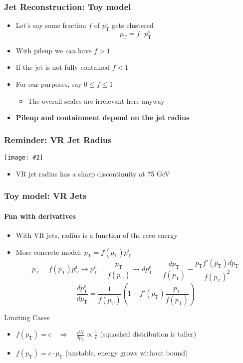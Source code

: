 \documentclass[xcolor={table}]{beamer}
\newcommand{\pt}{p_{\mathrm{T}}}
\newcommand{\ptr}{\pt}
\newcommand{\ptt}{\pt^{\text{s}}}
\newcommand{\graphic}[2][0.99]{\texttt{[image: \#2]}}
\begin{document}
\begin{frame}
  \frametitle{Jet Reconstruction: Toy model}
  \begin{itemize}
  \item Let's say some fraction $f$ of $\ptt$ gets clustered
    \[\ptr = f \cdot \ptt \]
  \item With pileup we \emph{can} have $f > 1$
  \item If the jet is not fully contained $f < 1$
  \item For our purposes, say $0 \leq f \leq 1$
    \begin{itemize}
    \item The overall scales are irrelevant here anyway
    \end{itemize}
  \item \textbf{Pileup and containment depend on the jet radius}
  \end{itemize}
\end{frame}

\begin{frame}
  \frametitle{Reminder: VR Jet Radius}
  \begin{center}
    \graphic[0.8]{radii-vs-pt.pdf}
  \begin{itemize}
  \item VR jet radius has a sharp discontinuity at 75 GeV
  \end{itemize}
  \end{center}
\end{frame}

\begin{frame}
  \frametitle{Toy model: VR Jets}
  \framesubtitle{Fun with derivatives}
  \begin{itemize}
  \item With VR jets, radius is a function of the reco energy
  \item More concrete model: $\boxed{\ptr = f(\ptr) \ptt}$
    \[ \ptr = f(\ptr) \ptt \to \ptt = \frac{\ptr}{f(\ptr)} \to d\ptt = \frac{d\ptr}{f(\ptr)} - \frac{\ptr f'(\ptr) d\ptr}{f(\ptr)^2} \]
    \[ \boxed{ \frac{d\ptt}{d\ptr} = \frac{1}{f(\ptr)} \left( 1 - f'(\ptr) \frac{\ptr}{f(\ptr)} \right) } \]
  \end{itemize}
  \begin{block}{Limiting Cases}
    \begin{itemize}
    \item $f(\ptr) = c \quad \Rightarrow \quad \frac{dN}{d\ptr} \propto \frac{1}{c}$ (squashed distribution is taller)
    \item $f(\ptr) = c \cdot \ptr$ (unstable, energy grows without bound)
    \end{itemize}
  \end{block}
\end{frame}
\end{document}
